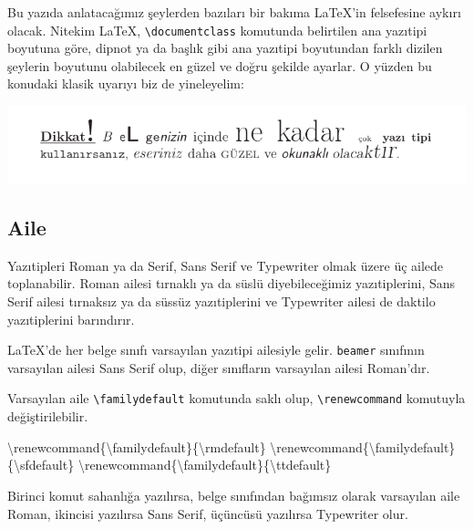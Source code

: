 \documentclass[
  10pt,
]{scrbook}
\newenvironment{Shaded}{\begin{snugshade}}{\end{snugshade}}
\newcommand{\ExtensionTok}[1]{#1}
\newcommand{\FunctionTok}[1]{\textcolor[rgb]{0.00,0.00,0.00}{#1}}
\newcommand{\NormalTok}[1]{#1}
\theoremstyle{definition}
\theoremstyle{definition}
\theoremstyle{definition}
\theoremstyle{definition}
\theoremstyle{remark}
\begin{document}
Bu yazıda anlatacağımız şeylerden bazıları bir bakıma LaTeX'in felsefesine aykırı olacak. Nitekim LaTeX, \texttt{\textbackslash{}documentclass} komutunda belirtilen ana yazıtipi boyutuna göre, dipnot ya da başlık gibi ana yazıtipi boyutundan farklı dizilen şeylerin boyutunu olabilecek en güzel ve doğru şekilde ayarlar. O yüzden bu konudaki klasik uyarıyı biz de yineleyelim:

\includegraphics[width=1\textwidth,height=\textheight]{images/uyari.png}

\hypertarget{aile}{%
\subsection{Aile}\label{aile}}

Yazıtipleri Roman ya da Serif, Sans Serif ve Typewriter olmak üzere üç ailede toplanabilir. Roman ailesi tırnaklı ya da süslü diyebileceğimiz yazıtiplerini, Sans Serif ailesi tırnaksız ya da süssüz yazıtiplerini ve Typewriter ailesi de daktilo yazıtiplerini barındırır.

LaTeX'de her belge sınıfı varsayılan yazıtipi ailesiyle gelir. \texttt{beamer} sınıfının varsayılan ailesi Sans Serif olup, diğer sınıfların varsayılan ailesi Roman'dır.

Varsayılan aile \texttt{\textbackslash{}familydefault} komutunda saklı olup, \texttt{\textbackslash{}renewcommand} komutuyla değiştirilebilir.

\begin{Shaded}
\begin{Highlighting}[]
\FunctionTok{\textbackslash{}renewcommand}\NormalTok{\{}\ExtensionTok{\textbackslash{}familydefault}\NormalTok{\}\{}\FunctionTok{\textbackslash{}rmdefault}\NormalTok{\}  }
\FunctionTok{\textbackslash{}renewcommand}\NormalTok{\{}\ExtensionTok{\textbackslash{}familydefault}\NormalTok{\}\{}\FunctionTok{\textbackslash{}sfdefault}\NormalTok{\}  }
\FunctionTok{\textbackslash{}renewcommand}\NormalTok{\{}\ExtensionTok{\textbackslash{}familydefault}\NormalTok{\}\{}\FunctionTok{\textbackslash{}ttdefault}\NormalTok{\} }
\end{Highlighting}
\end{Shaded}

Birinci komut sahanlığa yazılırsa, belge sınıfından bağımsız olarak varsayılan aile Roman, ikincisi yazılırsa Sans Serif, üçüncüsü yazılırsa Typewriter olur.
\end{document}
